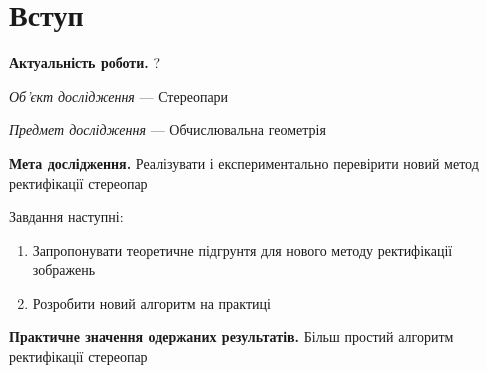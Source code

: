 \chapter*{Вступ}

\textbf{Актуальність роботи.}
?

\textit{Об’єкт дослідження} --- Стереопари

\textit{Предмет дослідження} --- Обчислювальна геометрія

\textbf{Мета дослідження.}
Реалізувати і експериментально перевірити новий метод ректифікації стереопар 

Завдання наступні:
\begin{enumerate}
  \item
    Запропонувати теоретичне підгрунтя для нового методу ректифікації зображень
  \item
    Розробити новий алгоритм на практиці
\end{enumerate}

\textbf{Практичне значення одержаних результатів.}
Більш простий алгоритм ректифікації стереопар